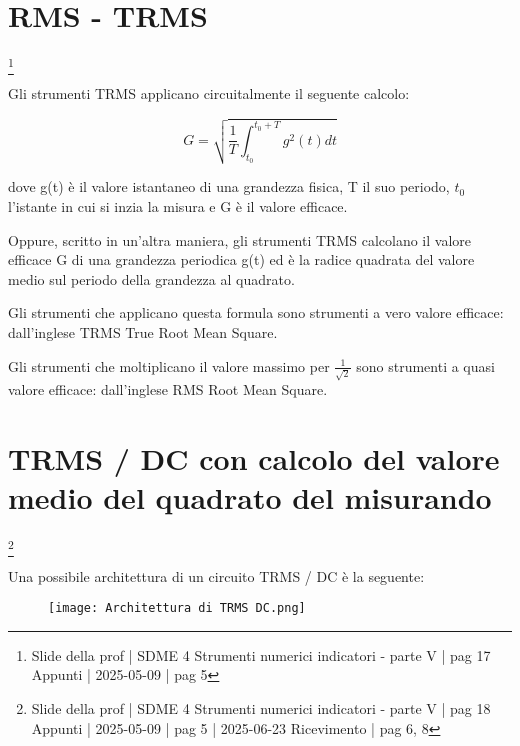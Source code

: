 \newpage 

\section{RMS - TRMS}
\footnote{Slide della prof | SDME 4 Strumenti numerici indicatori - parte V | pag 17\\  
Appunti | 2025-05-09 | pag 5}

Gli strumenti TRMS applicano circuitalmente il seguente calcolo: 

{
    \Large 
    \begin{equation}
        G 
        = 
        \sqrt
        {
            \frac{1}{T}
            \int_{t_0}^{t_0 + T} 
            g^{2} (t) dt
        }
    \end{equation}
}

dove g(t) è il valore istantaneo di una grandezza fisica, T il suo periodo, $t_0$ l'istante in cui si inzia la misura e G è il valore efficace. \newline 

Oppure, scritto in un'altra maniera, gli strumenti TRMS calcolano il valore efficace G di una grandezza periodica g(t) ed è 
la radice quadrata del valore medio sul periodo della grandezza al quadrato. \newline 

Gli strumenti che applicano questa formula sono strumenti a vero valore efficace: 
dall'inglese TRMS True Root Mean Square. \newline 

Gli strumenti che moltiplicano il valore massimo per $\frac{1}{\sqrt{2}}$ sono strumenti a quasi valore efficace: 
dall'inglese RMS Root Mean Square. \newline 

\newpage 

\section{TRMS / DC con calcolo del valore medio del quadrato del misurando}
\footnote{Slide della prof | SDME 4 Strumenti numerici indicatori - parte V | pag 18\\  
Appunti | 2025-05-09 | pag 5 | 2025-06-23 Ricevimento | pag 6, 8 }

Una possibile architettura di un circuito TRMS / DC è la seguente: 

\begin{figure}[h]
    \centering
    \texttt{[image: Architettura di TRMS DC.png]}
\end{figure}

